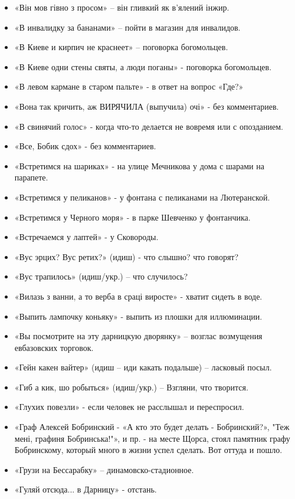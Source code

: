 \begin{itemize}
\item  «Він мов гівно з просом» – він гливкий як в’ялений інжир. 
\item  «В инвалидку за бананами» – пойти в магазин для инвалидов.
\item  «В Киеве и кирпич не краснеет» – поговорка богомольцев. 
\item  «В Киеве одни стены святы, а люди поганы» - поговорка богомольцев.
\item  «В левом кармане в старом пальте» - в ответ на вопрос «Где?»
\item  «Вона так кричить, аж ВИРЯЧИЛА (выпучила) очі» - без комментариев.
\item  «В свинячий голос» - когда что-то делается не вовремя или с опозданием.
\item  «Все, Бобик сдох» - без комментариев.
\item  «Встретимся на шариках» - на улице Мечникова у дома с шарами на парапете. 
\item  «Встретимся у пеликанов» - у фонтана с пеликанами  на Лютеранской.
\item  «Встретимся у Черного моря» - в парке Шевченко у фонтанчика.
\item  «Встречаемся у лаптей» - у Сковороды.
\item  «Вус эрцих? Вус ретих?» (идиш) - что слышно? что говорят?
\item  «Вус трапилось» (идиш/укр.) – что случилось?
\item  «Вилазь з ванни, а то верба в сраці виросте» - хватит сидеть в воде.
\item  «Выпить лампочку коньяку» - выпить из плошки для иллюминации.
\item  «Вы посмотрите на эту дарницкую дворянку» – возглас возмущения евбазовских торговок.
\item  «Гейн какен вайтер» (идиш – иди какать подальше) – ласковый посыл.
\item  «Гиб а кик, шо робыться» (идиш/укр.) – Взгляни, что творится.
\item  «Глухих повезли» - если человек не расслышал и переспросил.
\item  «Граф Алексей Бобринский - «А кто это будет делать - Бобринский?», "Теж мені, графиня Бобринська!"», и пр. - на месте Щорса, стоял памятник графу Бобринскому, который много в жизни успел сделать. Вот оттуда и пошло.
\item  «Грузи на Бессарабку» – динамовско-стадионное.
\item  «Гуляй отсюда... в Дарницу» - отстань.

\end{itemize}
